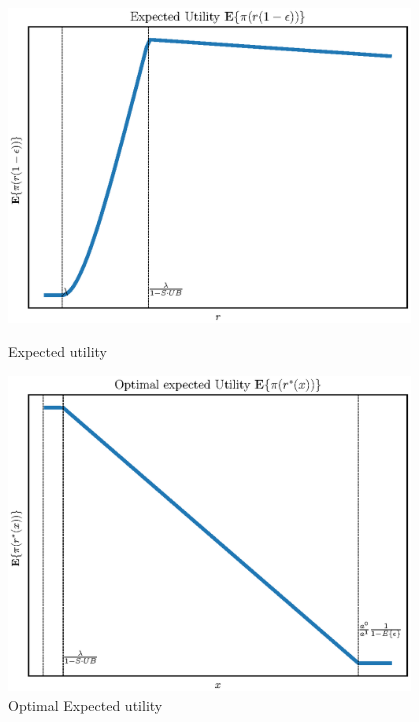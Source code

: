 \begin{figure}[htbp] 
\centering
\begin{minipage}[t]{0.49\textwidth}
   \centering
   \includegraphics[width=0.95\textwidth]{Figures/ExpectedUt} 
   \caption{Expected utility}
   \label{figExUt}
\end{minipage}
\hfill
\begin{minipage}[t]{0.49\textwidth}
   \centering
   \includegraphics[width=0.95\textwidth]{Figures/OptExpUt} 
   \caption{Optimal Expected utility}
   \label{figOpExUt}
\end{minipage}
\end{figure}

